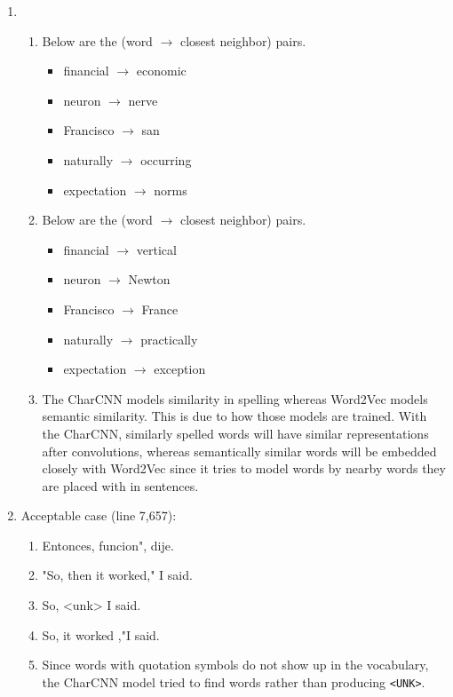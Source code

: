 \documentclass[12pt]{article}
\begin{document}
\begin{enumerate}[label=\textbf{\arabic*.}]
\begin{enumerate}[label=(\alph*)]
    \item
    \begin{enumerate}[label=\roman*.]
      \item Below are the (word $\rightarrow$ closest neighbor) pairs.
        \begin{itemize}
          \item financial $\rightarrow$ economic
          \item neuron $\rightarrow$ nerve
          \item Francisco $\rightarrow$ san
          \item naturally $\rightarrow$ occurring
          \item expectation $\rightarrow$ norms
        \end{itemize}
      \item Below are the (word $\rightarrow$ closest neighbor) pairs.
        \begin{itemize}
          \item financial $\rightarrow$ vertical
          \item neuron $\rightarrow$ Newton
          \item Francisco $\rightarrow$ France
          \item naturally $\rightarrow$ practically
          \item expectation $\rightarrow$ exception
        \end{itemize}
      \item The CharCNN models similarity in spelling whereas Word2Vec models semantic similarity. This is due to how those models are trained. With the CharCNN, similarly spelled words will have similar representations after convolutions, whereas semantically similar words will be embedded closely with Word2Vec since it tries to model words by nearby words they are placed with in sentences.
    \end{enumerate}
    \item Acceptable case (line 7,657):
    \begin{enumerate}[label=\arabic*.]
      \item Entonces, funcion", dije.
      \item "So, then it worked," I said.
      \item So, <unk> I said.
      \item So, it worked ,"I said.
      \item Since words with quotation symbols do not show up in the vocabulary, the CharCNN model tried to find words rather than producing \texttt{<UNK>}.

\end{enumerate}
\end{enumerate}
\end{enumerate}
\end{document}
